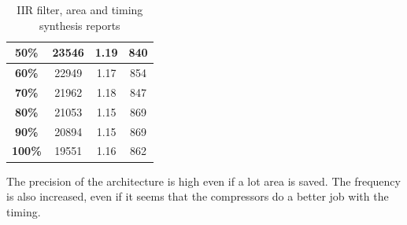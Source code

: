 \documentclass[a4paper]{article}
\begin{document}
\begin{table}[hbtp]
\begin{tabular}{|c|c|c|c|}
		\textbf{50\%}                                                                   & 		23546                                                                      & 		1.19                                                                       & 		840                                                                                  \\ \hline
		\textbf{60\%}                                                                   & 		22949                                                                      & 		1.17                                                                       & 		854                                                                                  \\ \hline
		\textbf{70\%}                                                                   & 		21962                                                                      & 		1.18                                                                       & 		847                                                                                  \\ \hline
		\textbf{80\%}                                                                   & 		21053                                                                      & 		1.15                                                                       & 		869                                                                                  \\ \hline
		\textbf{90\%}                                                                   & 		20894                                                                      & 		1.15                                                                       & 		869                                                                                  \\ \hline
		\textbf{100\%}                                                                  & 		19551                                                                      & 		1.16                                                                       & 		862                                                                                  \\ \hline
		\end{tabular}
		\caption{IIR filter, area and timing synthesis reports}
		\label{tab:iir_syn}
	\end{table}

	The precision of the architecture is high even if a lot area is saved. The frequency is also increased, even if it seems that the compressors do a better job with the timing.
\end{document}

